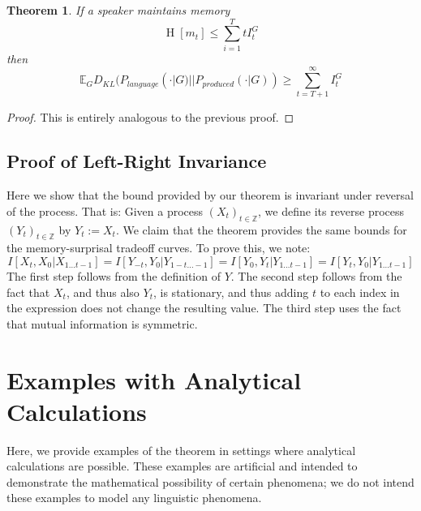 \documentclass[11pt,letterpaper]{article}
\newcommand{\E}[0]{\mathbb{E}}
\newcounter{theorem}
\newtheorem{thm}[theorem]{Theorem}
\begin{document}
\begin{thm}
If a speaker maintains memory
	\begin{equation}
		\operatorname{H}[m_t] \leq \sum_{i=1}^T tI_t^G
	\end{equation}
	then 
\begin{equation}
\E_G	D_{KL}(P_{language}(\cdot|G)||P_{produced}(\cdot|G)) \geq \sum_{t=T+1}^\infty I_t^G
\end{equation}
\end{thm}

\begin{proof}
This is entirely analogous to the previous proof.
\end{proof}


\subsection{Proof of Left-Right Invariance}

Here we show that the bound provided by our theorem is invariant under reversal of the process.
That is: Given a process $(X_t)_{t \in \mathbb{Z}}$, we define its reverse process $(Y_t)_{t \in \mathbb{Z}}$ by $Y_t := X_t$.
We claim that the theorem provides the same bounds for the memory-surprisal tradeoff curves.
To prove this, we note:
\begin{equation}
	I[X_t, X_0|X_{1\dots t-1}] = I[Y_{-t}, Y_0|Y_{1-t\dots -1}] = I[Y_0, Y_t|Y_{1\dots t-1}] = I[Y_t, Y_0|Y_{1\dots t-1}]
\end{equation}
The first step follows from the definition of $Y$. The second step follows from the fact that $X_t$, and thus also $Y_t$, is stationary, and thus adding $t$ to each index in the expression does not change the resulting value. The third step uses the fact that mutual information is symmetric.


\section{Examples with Analytical Calculations}

Here, we provide examples of the theorem in settings where analytical calculations are possible.
These examples are artificial and intended to demonstrate the mathematical possibility of certain phenomena; we do not intend these examples to model any linguistic phenomena.


%
%
\end{document}
